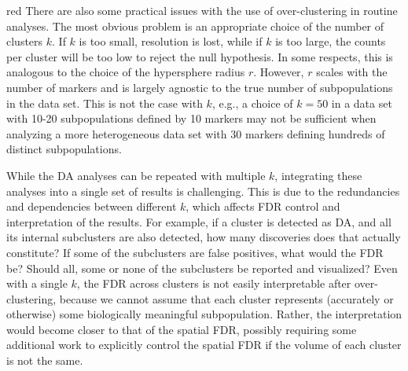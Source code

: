 \documentclass{article}
\begin{document}
\begin{color}{red}
There are also some practical issues with the use of over-clustering in routine analyses.
The most obvious problem is an appropriate choice of the number of clusters $k$.
If $k$ is too small, resolution is lost, while if $k$ is too large, the counts per cluster will be too low to reject the null hypothesis.
In some respects, this is analogous to the choice of the hypersphere radius $r$.
However, $r$ scales with the number of markers and is largely agnostic to the true number of subpopulations in the data set.
This is not the case with $k$, e.g., a choice of $k=50$ in a data set with 10-20 subpopulations defined by 10 markers may not be sufficient when analyzing a more heterogeneous data set with 30 markers defining hundreds of distinct subpopulations.

While the DA analyses can be repeated with multiple $k$, integrating these analyses into a single set of results is challenging.
This is due to the redundancies and dependencies between different $k$, which affects FDR control and interpretation of the results.
For example, if a cluster is detected as DA, and all its internal subclusters are also detected, how many discoveries does that actually constitute?
If some of the subclusters are false positives, what would the FDR be?
Should all, some or none of the subclusters be reported and visualized?
Even with a single $k$, the FDR across clusters is not easily interpretable after over-clustering, because we cannot assume that each cluster represents (accurately or otherwise) some biologically meaningful subpopulation.
Rather, the interpretation would become closer to that of the spatial FDR, possibly requiring some additional work to explicitly control the spatial FDR if the volume of each cluster is not the same.
\end{color}

\newpage
\end{document}

